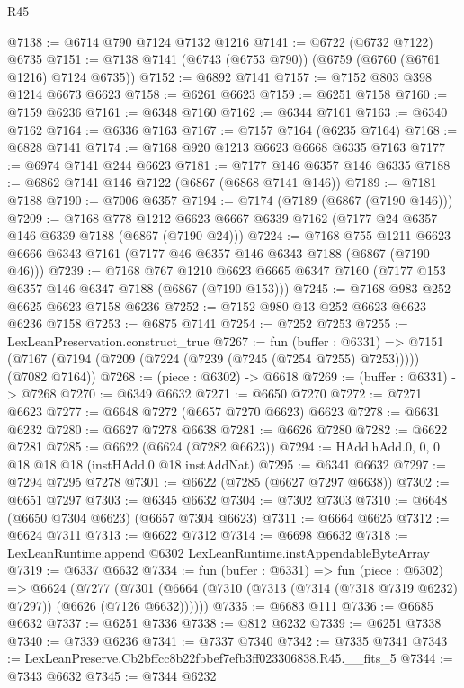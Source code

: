 \begin{lexlean}{R45}
\begin{coremodule}
{@7138 := @6714 @790 @7124 @7132 @1216
@7141 := @6722 (@6732 @7122) @6735
@7151 := @7138 @7141 (@6743 (@6753 @790)) (@6759 (@6760 (@6761 @1216) @7124 @6735))
@7152 := @6892 @7141
@7157 := @7152 @803 @398 @1214 @6673 @6623
@7158 := @6261 @6623
@7159 := @6251 @7158
@7160 := @7159 @6236
@7161 := @6348 @7160
@7162 := @6344 @7161
@7163 := @6340 @7162
@7164 := @6336 @7163
@7167 := @7157 @7164 (@6235 @7164)
@7168 := @6828 @7141
@7174 := @7168 @920 @1213 @6623 @6668 @6335 @7163
@7177 := @6974 @7141 @244 @6623
@7181 := @7177 @146 @6357 @146 @6335
@7188 := @6862 @7141 @146 @7122 (@6867 (@6868 @7141 @146))
@7189 := @7181 @7188
@7190 := @7006 @6357
@7194 := @7174 (@7189 (@6867 (@7190 @146)))
@7209 := @7168
    @778
    @1212
    @6623
    @6667
    @6339
    @7162
    (@7177 @24 @6357 @146 @6339 @7188 (@6867 (@7190 @24)))
@7224 := @7168
    @755
    @1211
    @6623
    @6666
    @6343
    @7161
    (@7177 @46 @6357 @146 @6343 @7188 (@6867 (@7190 @46)))
@7239 := @7168
    @767
    @1210
    @6623
    @6665
    @6347
    @7160
    (@7177 @153 @6357 @146 @6347 @7188 (@6867 (@7190 @153)))
@7245 := @7168 @983 @252 @6625 @6623 @7158 @6236
@7252 := @7152 @980 @13 @252 @6623 @6623 @6236 @7158
@7253 := @6875 @7141
@7254 := @7252 @7253
@7255 := LexLeanPreservation.construct_true
@7267 := fun (buffer : @6331) =>
  @7151 (@7167 (@7194 (@7209 (@7224 (@7239 (@7245 (@7254 @7255) @7253))))) (@7082 @7164))
@7268 := (piece : @6302) -> @6618
@7269 := (buffer : @6331) -> @7268
@7270 := @6349 @6632
@7271 := @6650 @7270
@7272 := @7271 @6623
@7277 := @6648 @7272 (@6657 @7270 @6623) @6623
@7278 := @6631 @6232
@7280 := @6627 @7278 @6638
@7281 := @6626 @7280
@7282 := @6622 @7281
@7285 := @6622 (@6624 (@7282 @6623))
@7294 := HAdd.hAdd.{0, 0, 0} @18 @18 @18 (instHAdd.{0} @18 instAddNat)
@7295 := @6341 @6632
@7297 := @7294 @7295 @7278
@7301 := @6622 (@7285 (@6627 @7297 @6638))
@7302 := @6651 @7297
@7303 := @6345 @6632
@7304 := @7302 @7303
@7310 := @6648 (@6650 @7304 @6623) (@6657 @7304 @6623)
@7311 := @6664 @6625
@7312 := @6624 @7311
@7313 := @6622 @7312
@7314 := @6698 @6632
@7318 := LexLeanRuntime.append @6302 LexLeanRuntime.instAppendableByteArray
@7319 := @6337 @6632
@7334 := fun (buffer : @6331) =>
  fun (piece : @6302) =>
  @6624
    (@7277 (@7301 (@6664 (@7310 (@7313 (@7314 (@7318 @7319 @6232) @7297)) (@6626 (@7126 @6632))))))
@7335 := @6683 @111
@7336 := @6685 @6632
@7337 := @6251 @7336
@7338 := @812 @6232
@7339 := @6251 @7338
@7340 := @7339 @6236
@7341 := @7337 @7340
@7342 := @7335 @7341
@7343 := LexLeanPreserve.Cb2bffcc8b22fbbef7efb3ff023306838.R45.__fits_5
@7344 := @7343 @6632
@7345 := @7344 @6232
}
\end{coremodule}
\end{lexlean}
